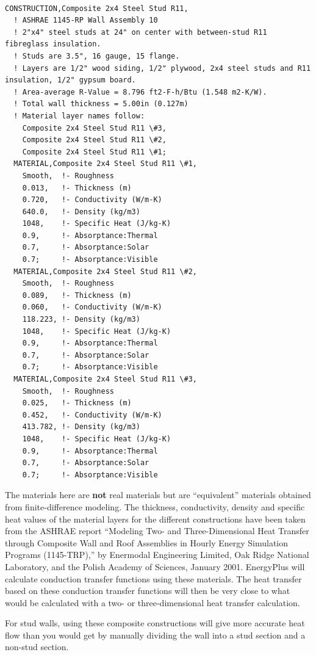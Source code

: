 \begin{lstlisting}

CONSTRUCTION,Composite 2x4 Steel Stud R11,
  ! ASHRAE 1145-RP Wall Assembly 10
  ! 2"x4" steel studs at 24" on center with between-stud R11 fibreglass insulation.
  ! Studs are 3.5", 16 gauge, 15 flange.
  ! Layers are 1/2" wood siding, 1/2" plywood, 2x4 steel studs and R11 insulation, 1/2" gypsum board.
  ! Area-average R-Value = 8.796 ft2-F-h/Btu (1.548 m2-K/W).
  ! Total wall thickness = 5.00in (0.127m)
  ! Material layer names follow:
    Composite 2x4 Steel Stud R11 \#3,
    Composite 2x4 Steel Stud R11 \#2,
    Composite 2x4 Steel Stud R11 \#1;
  MATERIAL,Composite 2x4 Steel Stud R11 \#1,
    Smooth,  !- Roughness
    0.013,   !- Thickness (m)
    0.720,   !- Conductivity (W/m-K)
    640.0,   !- Density (kg/m3)
    1048,    !- Specific Heat (J/kg-K)
    0.9,     !- Absorptance:Thermal
    0.7,     !- Absorptance:Solar
    0.7;     !- Absorptance:Visible
  MATERIAL,Composite 2x4 Steel Stud R11 \#2,
    Smooth,  !- Roughness
    0.089,   !- Thickness (m)
    0.060,   !- Conductivity (W/m-K)
    118.223, !- Density (kg/m3)
    1048,    !- Specific Heat (J/kg-K)
    0.9,     !- Absorptance:Thermal
    0.7,     !- Absorptance:Solar
    0.7;     !- Absorptance:Visible
  MATERIAL,Composite 2x4 Steel Stud R11 \#3,
    Smooth,  !- Roughness
    0.025,   !- Thickness (m)
    0.452,   !- Conductivity (W/m-K)
    413.782, !- Density (kg/m3)
    1048,    !- Specific Heat (J/kg-K)
    0.9,     !- Absorptance:Thermal
    0.7,     !- Absorptance:Solar
    0.7;     !- Absorptance:Visible
\end{lstlisting}

The materials here are \textbf{not} real materials but are ``equivalent'' materials obtained from finite-difference modeling. The thickness, conductivity, density and specific heat values of the material layers for the different constructions have been taken from the ASHRAE report ``Modeling Two- and Three-Dimensional Heat Transfer through Composite Wall and Roof Assemblies in Hourly Energy Simulation Programs (1145-TRP),'' by Enermodal Engineering Limited, Oak Ridge National Laboratory, and the Polish Academy of Sciences, January 2001. EnergyPlus will calculate conduction transfer functions using these materials. The heat transfer based on these conduction transfer functions will then be very close to what would be calculated with a two- or three-dimensional heat transfer calculation.

For stud walls, using these composite constructions will give more accurate heat flow than you would get by manually dividing the wall into a stud section and a non-stud section.

